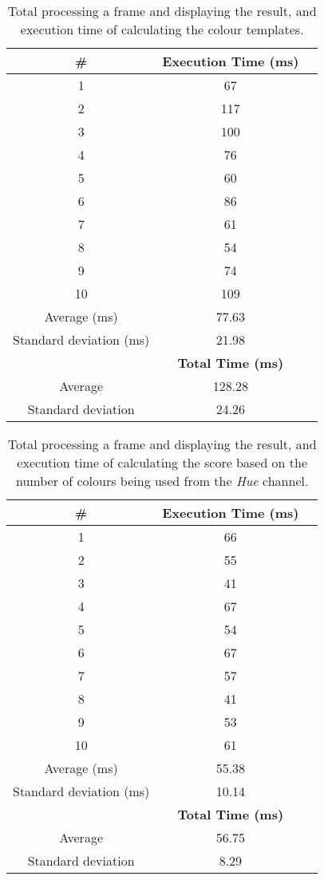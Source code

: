 \begin{table}[h]
	\footnotesize
    \begin{center}
    \begin{tabular}{c c c}
    \hline 
    \textbf{\#} & \textbf{Execution Time (ms)}\\ \hline
	1&	67\\
	2&	117\\
	3&	100\\
	4&	76\\
	5&	60\\
	6&	86\\
	7&	61\\
	8&	54\\
	9&	74\\
	10&	109\\
	\hline
	Average (ms) &	77.63 \\
	Standard deviation (ms) & 21.98\\
	\hline 
	&\textbf{Total Time (ms)}\\
    \hline
    Average	& 128.28\\
    Standard deviation & 24.26\\
    \hline
    \end{tabular}
	\end{center}
    \caption{Total processing a frame and displaying the result, and execution time of calculating the colour templates.}
\end{table}

\begin{table}[h]
	\footnotesize
    \begin{center}
    \begin{tabular}{c c c}
    \hline 
    \textbf{\#} & \textbf{Execution Time (ms)}\\ \hline
1&	66\\
2&	55\\
3&	41\\
4&	67\\
5&	54\\
6&	67\\
7&	57\\
8&	41\\
9&	53\\
10&	61\\
	\hline
	Average (ms) &	55.38 \\
	Standard deviation (ms) & 10.14\\
	\hline
	& \textbf{Total Time (ms)}\\
    \hline
    Average	& 56.75\\
    Standard deviation & 8.29\\
    \hline
    \end{tabular}
	\end{center}
    \caption{Total processing a frame and displaying the result, and execution time of calculating the score based on the number of colours being used from the \emph{Hue} channel.}
\end{table}

